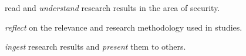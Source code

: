 \item read and \emph{understand} research results in the area of security.
\item \emph{reflect} on the relevance and research methodology used in studies.
\item \emph{ingest} research results and \emph{present} them to others.
